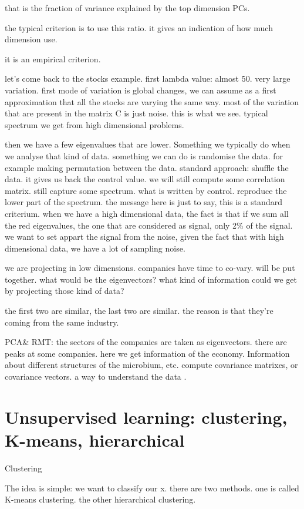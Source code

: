 \documentclass[a4paper]{tufte-book}
\begin{document}
that is the fraction of variance explained by the top dimension PCs.

the typical criterion is to use this ratio.
it gives an indication of how much dimension use.

it is an empirical  criterion.

let's come back to the stocks example. first lambda value: almost 50. very large
variation. first mode of variation is global changes, we can assume as
a first approximation that all the stocks are varying the same way. most of the
variation that are present in the matrix C is just noise.
this is what we see.
typical spectrum we get from high dimensional problems.

then we have a few eigenvalues that are lower. Something we typically do when we
analyse that kind of data.
something we can do is randomise the data. for example making permutation
between the data. standard approach: shuffle the data.
it gives us back the control value. we will still compute some correlation
matrix. still capture some spectrum. what is written by control.
reproduce the lower part of the spectrum.
the message here is just to say, this is a standard criterium.
when we have a high dimensional data, the fact is that if we sum all the red
eigenvalues, the one that are considered as signal, only 2\% of the signal.
we want to set appart the signal from the noise, given the fact that
with high dimensional data, we have a lot of sampling noise.

we are projecting in low dimensions. companies have time to co-vary. will be put
together. what would be the eigenvectors? what kind of information could we get 
by projecting those kind of data?

the first two are similar, the last two are similar. the reason is that they're 
coming from the same industry.

PCA\& RMT: the sectors of the companies are taken as eigenvectors.
there are peaks at some companies. here we get information of the economy.
Information about different structures of the microbium, etc.
compute covariance matrixes, or covariance vectors. a way to understand the data
.



\chapter{Unsupervised learning: clustering, K-means, hierarchical}
\label{ch:unsupervised-2}
Clustering


The idea is simple: we want to classify our x. there are two methods. one is 
called K-means clustering.
the other hierarchical clustering.
\end{document}
